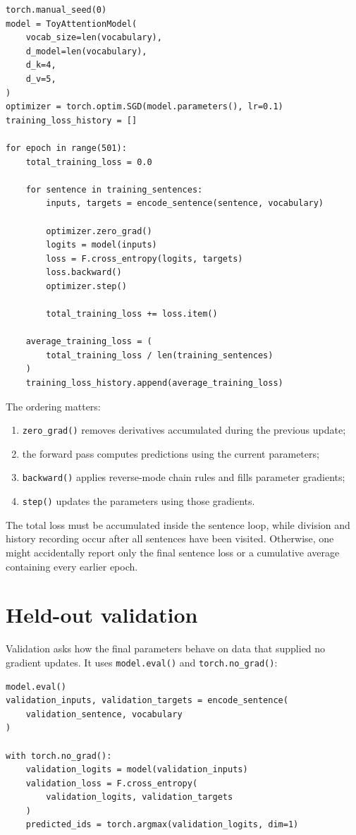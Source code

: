 \documentclass[11pt]{article}
\begin{document}
\begin{lstlisting}
torch.manual_seed(0)
model = ToyAttentionModel(
    vocab_size=len(vocabulary),
    d_model=len(vocabulary),
    d_k=4,
    d_v=5,
)
optimizer = torch.optim.SGD(model.parameters(), lr=0.1)
training_loss_history = []

for epoch in range(501):
    total_training_loss = 0.0

    for sentence in training_sentences:
        inputs, targets = encode_sentence(sentence, vocabulary)

        optimizer.zero_grad()
        logits = model(inputs)
        loss = F.cross_entropy(logits, targets)
        loss.backward()
        optimizer.step()

        total_training_loss += loss.item()

    average_training_loss = (
        total_training_loss / len(training_sentences)
    )
    training_loss_history.append(average_training_loss)
\end{lstlisting}

The ordering matters:
\begin{enumerate}
\item \texttt{zero\_grad()} removes derivatives accumulated during the previous update;
\item the forward pass computes predictions using the current parameters;
\item \texttt{backward()} applies reverse-mode chain rules and fills parameter gradients;
\item \texttt{step()} updates the parameters using those gradients.
\end{enumerate}

The total loss must be accumulated inside the sentence loop, while division and history recording occur after
all sentences have been visited. Otherwise, one might accidentally report only the final sentence loss or a
cumulative average containing every earlier epoch.

\section{Held-out validation}

Validation asks how the final parameters behave on data that supplied no gradient updates. It uses
\texttt{model.eval()} and \texttt{torch.no\_grad()}:

\begin{lstlisting}
model.eval()
validation_inputs, validation_targets = encode_sentence(
    validation_sentence, vocabulary
)

with torch.no_grad():
    validation_logits = model(validation_inputs)
    validation_loss = F.cross_entropy(
        validation_logits, validation_targets
    )
    predicted_ids = torch.argmax(validation_logits, dim=1)
\end{lstlisting}
\end{document}
